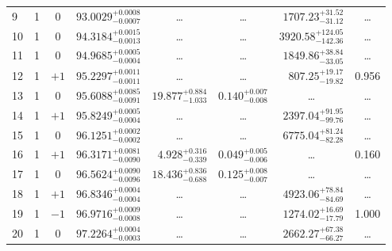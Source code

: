 \begin{table*}[!]
\begin{tabular}{llcrrlrc}
9 & 1 & 0 & $     93.0029_{-      0.0007}^{+      0.0008}$ & \multicolumn{1}{c}{\dots} & \multicolumn{1}{c}{\dots} & $     1707.23_{-       31.12}^{+       31.52}$ & \dots \\[1pt]
10 & 1 & 0 & $     94.3184_{-      0.0013}^{+      0.0015}$ & \multicolumn{1}{c}{\dots} & \multicolumn{1}{c}{\dots} & $     3920.58_{-      142.36}^{+      124.05}$ & \dots\\[1pt]
11 & 1 & 0 & $     94.9685_{-      0.0004}^{+      0.0005}$ & \multicolumn{1}{c}{\dots} & \multicolumn{1}{c}{\dots} & $     1849.86_{-       33.05}^{+       38.84}$ & \dots\\[1pt]
12 & 1 & $+1$ & $     95.2297_{-      0.0011}^{+      0.0011}$ & \multicolumn{1}{c}{\dots} & \multicolumn{1}{c}{\dots} & $      807.25_{-       19.82}^{+       19.17}$ & 0.956\\[1pt]
13 & 1 & 0& $     95.6088_{-      0.0091}^{+      0.0085}$ & $      19.877_{-       1.033}^{+       0.884}$ & $       0.140_{-       0.008}^{+       0.007}$ & \multicolumn{1}{c}{\dots} & \dots\\[1pt]
14 & 1 & $+1$ & $     95.8249_{-      0.0004}^{+      0.0005}$ & \multicolumn{1}{c}{\dots} & \multicolumn{1}{c}{\dots} & $     2397.04_{-       99.76}^{+       91.95}$ & \dots\\[1pt]
15 & 1 & 0 & $     96.1251_{-      0.0002}^{+      0.0002}$ & \multicolumn{1}{c}{\dots} & \multicolumn{1}{c}{\dots} & $     6775.04_{-       82.28}^{+       81.24}$ & \dots \\[1pt]
16 & 1 & $+1$ & $     96.3171_{-      0.0090}^{+      0.0081}$ & $       4.928_{-       0.339}^{+       0.316}$ & $       0.049_{-       0.006}^{+       0.005}$ & \multicolumn{1}{c}{\dots} & 0.160\\[1pt]
17 & 1 & 0 & $     96.5624_{-      0.0096}^{+      0.0090}$ & $      18.436_{-       0.688}^{+       0.836}$ & $       0.125_{-       0.007}^{+       0.008}$ & \multicolumn{1}{c}{\dots} & \dots\\[1pt]
18 & 1 & $+1$ & $     96.8346_{-      0.0004}^{+      0.0004}$ & \multicolumn{1}{c}{\dots} & \multicolumn{1}{c}{\dots} & $     4923.06_{-       84.69}^{+       78.84}$ & \dots\\[1pt]
19 & 1 & $-1$ & $     96.9716_{-      0.0008}^{+      0.0009}$ & \multicolumn{1}{c}{\dots} & \multicolumn{1}{c}{\dots} & $     1274.02_{-       17.79}^{+       16.69}$ & 1.000\\[1pt]
20 & 1 & 0 & $     97.2264_{-      0.0003}^{+      0.0004}$ & \multicolumn{1}{c}{\dots} & \multicolumn{1}{c}{\dots} & $     2662.27_{-       66.27}^{+       67.38}$ & \dots\\[1pt]

\end{tabular}
\end{table*}
